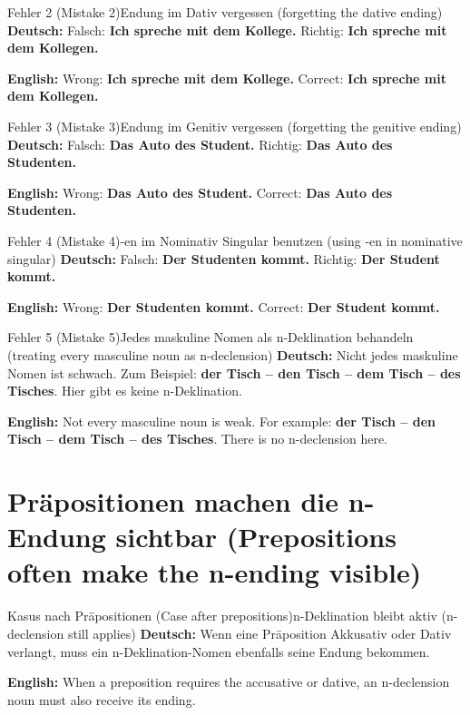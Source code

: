 \documentclass[a4paper,11pt]{article}
\newcommand{\GermanText}[1]{\textbf{Deutsch: }#1\par}
\newcommand{\EnglishText}[1]{{\small\color{SoftGray}\textbf{English: }#1\par}}
\begin{document}
        \begin{grammarentry}{Fehler 2 \textnormal{(Mistake 2)}}{Endung im Dativ vergessen \textnormal{(forgetting the dative ending)}}
            \GermanText{Falsch: \textbf{Ich spreche mit dem Kollege.} Richtig: \textbf{Ich spreche mit dem Kollegen.}}
            \EnglishText{Wrong: \textbf{Ich spreche mit dem Kollege.} Correct: \textbf{Ich spreche mit dem Kollegen.}}
        \end{grammarentry}

        \begin{grammarentry}{Fehler 3 \textnormal{(Mistake 3)}}{Endung im Genitiv vergessen \textnormal{(forgetting the genitive ending)}}
            \GermanText{Falsch: \textbf{Das Auto des Student.} Richtig: \textbf{Das Auto des Studenten.}}
            \EnglishText{Wrong: \textbf{Das Auto des Student.} Correct: \textbf{Das Auto des Studenten.}}
        \end{grammarentry}

        \begin{grammarentry}{Fehler 4 \textnormal{(Mistake 4)}}{-en im Nominativ Singular benutzen \textnormal{(using -en in nominative singular)}}
            \GermanText{Falsch: \textbf{Der Studenten kommt.} Richtig: \textbf{Der Student kommt.}}
            \EnglishText{Wrong: \textbf{Der Studenten kommt.} Correct: \textbf{Der Student kommt.}}
        \end{grammarentry}

        \begin{grammarentry}{Fehler 5 \textnormal{(Mistake 5)}}{Jedes maskuline Nomen als n-Deklination behandeln \textnormal{(treating every masculine noun as n-declension)}}
            \GermanText{Nicht jedes maskuline Nomen ist schwach. Zum Beispiel: \textbf{der Tisch -- den Tisch -- dem Tisch -- des Tisches}. Hier gibt es keine n-Deklination.}
            \EnglishText{Not every masculine noun is weak. For example: \textbf{der Tisch -- den Tisch -- dem Tisch -- des Tisches}. There is no n-declension here.}
        \end{grammarentry}

    \section{Präpositionen machen die n-Endung sichtbar \textnormal{(Prepositions often make the n-ending visible)}}

        \begin{grammarentry}{Kasus nach Präpositionen \textnormal{(Case after prepositions)}}{n-Deklination bleibt aktiv \textnormal{(n-declension still applies)}}
            \GermanText{Wenn eine Präposition Akkusativ oder Dativ verlangt, muss ein n-Deklination-Nomen ebenfalls seine Endung bekommen.}
            \EnglishText{When a preposition requires the accusative or dative, an n-declension noun must also receive its ending.}
        \end{grammarentry}
\end{document}
